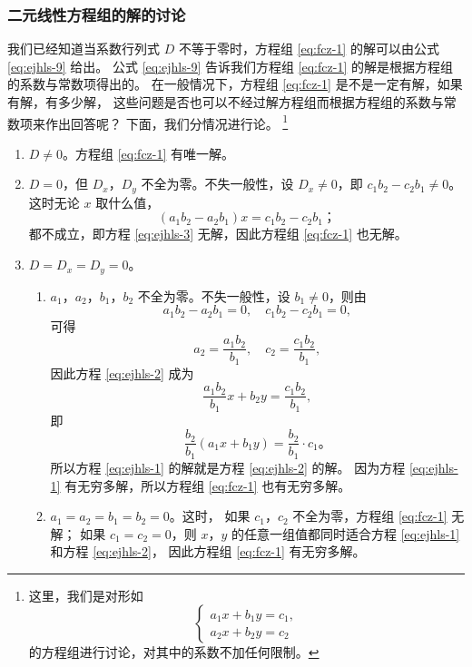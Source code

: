 \subsubsection{二元线性方程组的解的讨论}

我们已经知道当系数行列式 $D$ 不等于零时，方程组 \eqref{eq:fcz-1} 的解可以由公式 \eqref{eq:ejhls-9} 给出。
公式 \eqref{eq:ejhls-9} 告诉我们方程组 \eqref{eq:fcz-1} 的解是根据方程组的系数与常数项得出的。
在一般情况下，方程组 \eqref{eq:fcz-1} 是不是一定有解，如果有解，有多少解，
这些问题是否也可以不经过解方程组而根据方程组的系数与常数项来作出回答呢？
下面，我们分情况进行论。
\footnote{
    这里，我们是对形如
    $$\begin{cases}
        a_1x + b_1y = c_1, \\
        a_2x + b_2y = c_2
    \end{cases}$$
    的方程组进行讨论，对其中的系数不加任何限制。
}

\begin{enumerate}[(1), nosep]
    \item $D \neq 0$。方程组 \eqref{eq:fcz-1} 有唯一解。
    \item $D = 0$，但 $D_x$，$D_y$ 不全为零。不失一般性，设 $D_x \neq 0$，即 $c_1b_2 - c_2b_1 \neq 0$。这时无论 $x$ 取什么值，
        \begin{equation*}
            (a_1b_2 - a_2b_1)x = c_1b_2 - c_2b_1 \text{；} \tag{3}
        \end{equation*}
        都不成立，即方程 \eqref{eq:ejhls-3} 无解，因此方程组 \eqref{eq:fcz-1} 也无解。
    \item $D = D_x = D_y = 0$。
    \begin{enumerate}
        \item $a_1$，$a_2$，$b_1$，$b_2$ 不全为零。不失一般性，设 $b_1 \neq 0$，则由
            $$ a_1b_2 - a_2b_1 = 0, \quad c_1b_2 - c_2b_1 = 0, $$
            可得
            $$ a_2 = \dfrac{a_1b_2}{b_1}, \quad c_2 = \dfrac{c_1b_2}{b_1}, $$
            因此方程 \eqref{eq:ejhls-2} 成为
            $$ \dfrac{a_1b_2}{b_1}x + b_2y = \dfrac{c_1b_2}{b_1}, $$
            即
            $$ \dfrac{b_2}{b_1}(a_1x + b_1y) = \dfrac{b_2}{b_1} \cdot c_1 \text{。} $$
            所以方程 \eqref{eq:ejhls-1} 的解就是方程 \eqref{eq:ejhls-2} 的解。
            因为方程 \eqref{eq:ejhls-1} 有无穷多解，所以方程组 \eqref{eq:fcz-1} 也有无穷多解。

        \item $a_1 = a_2 = b_1 = b_2 = 0$。这时，
            如果 $c_1$，$c_2$ 不全为零，方程组 \eqref{eq:fcz-1} 无解；
            如果 $c_1 = c_2 = 0$，则 $x$，$y$ 的任意一组值都同时适合方程 \eqref{eq:ejhls-1} 和方程 \eqref{eq:ejhls-2}，
            因此方程组 \eqref{eq:fcz-1} 有无穷多解。
    \end{enumerate}
\end{enumerate}

